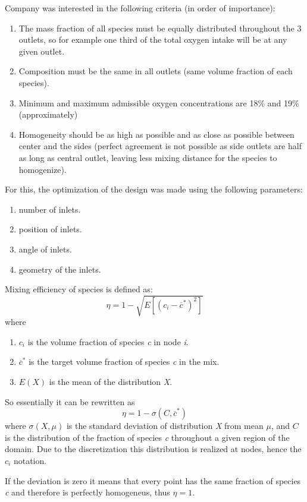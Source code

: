 Company was interested in the following criteria (in order of importance):
\begin{enumerate}
	\item The mass fraction of all species must be equally distributed throughout the 3 outlets, so for example one third of the total oxygen intake will be at any given outlet.
	\item Composition must be the same in all outlets (same volume fraction of each species).
	\item Minimum and maximum admissible oxygen concentrations are 18\% and 19\% (approximately)
	\item Homogeneity should be as high as possible and as close as possible between center and the sides (perfect agreement is not possible as side outlets are half as long as central outlet, leaving less mixing distance for the species to homogenize).
\end{enumerate}

For this, the optimization of the design was made using the following parameters:
\begin{enumerate}
	\item number of inlets.
	\item position of inlets.
	\item angle of inlets.
	\item geometry of the inlets.
\end{enumerate}

Mixing efficiency of species is defined as:
\begin{equation}
	\eta = 1 - \sqrt{E[(c_i - \overline{c}^*)^2]}
\end{equation}
where
\begin{enumerate}
	\item $c_i$ is the volume fraction of species \emph{c} in node \emph{i}.
	\item $\overline{c}^*$ is the target volume fraction of species \emph{c} in the mix.
	\item $E(X)$ is the mean of the distribution \emph{X}.
\end{enumerate}
So essentially it can be rewritten as
\begin{equation}
	\eta = 1 - \sigma(C,\overline{c}^*)
\end{equation}
where $\sigma(X,\mu)$ is the standard deviation of distribution \emph{X} from mean $\mu$, and $C$ is the distribution of the fraction of species \emph{c} throughout a given region of the domain. Due to the discretization this distribution is realized at nodes, hence the $c_i$ notation.

If the deviation is zero it means that every point has the same fraction of species \emph{c} and therefore is perfectly homogeneus, thus $\eta=1$.